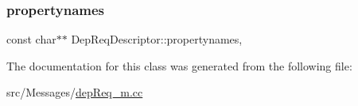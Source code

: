 \subsubsection{\texorpdfstring{propertynames}{propertynames}}
{\footnotesize\ttfamily const char$\ast$$\ast$ Dep\+Req\+Descriptor\+::propertynames\hspace{0.3cm}{\ttfamily [mutable]}, {\ttfamily [private]}}



The documentation for this class was generated from the following file\+:\begin{DoxyCompactItemize}
\item 
src/\+Messages/\hyperlink{depReq__m_8cc}{dep\+Req\+\_\+m.\+cc}\end{DoxyCompactItemize}
